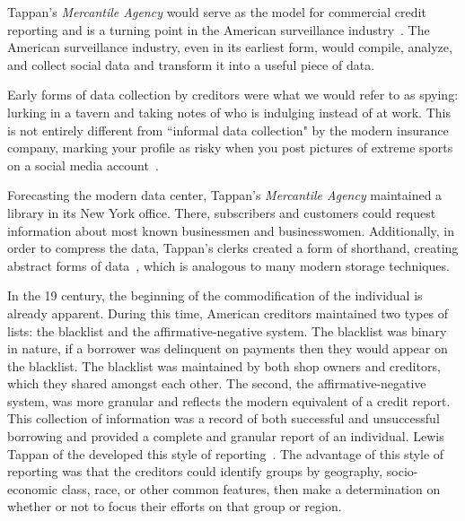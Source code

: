 Tappan's \textit{Mercantile Agency} would serve as the model for commercial
credit reporting and is a turning point in the American surveillance
industry~\cite{lauer2017creditworthy}. The American surveillance industry,
even in its earliest form, would compile, analyze, and collect social data and
transform it into a useful piece of data.

Early forms of data collection by creditors were what we would refer to as
spying: lurking in a tavern and taking notes of who is indulging instead of at
work. This is not entirely different from ``informal data collection" by the
modern insurance company, marking your profile as risky when you post pictures
of extreme sports on a social media account~\cite{naic2012}.

Forecasting the modern data center, Tappan's \textit{Mercantile Agency}
maintained a library in its New York office. There, subscribers and customers
could request information about most known businessmen and businesswomen.
Additionally, in order to compress the data, Tappan's clerks created a form of
shorthand, creating abstract forms of data~\cite{lauer2017creditworthy}, which
is analogous to many modern storage techniques.


In the 19 century, the beginning of the commodification of the
individual is already apparent. During this time, American creditors maintained
two types of lists: the blacklist and the affirmative-negative system. The
blacklist was binary in nature, if a borrower was delinquent on payments then
they would appear on the blacklist. The blacklist was maintained by both shop
owners and creditors, which they shared amongst each other. The second, the
affirmative-negative system, was more granular and reflects the modern
equivalent of a credit report. This collection of information was a record of
both successful and unsuccessful borrowing and provided a complete and granular
report of an individual. Lewis Tappan of the \mca developed this style of
reporting~\cite{lauer2017creditworthy}. The advantage of this style of
reporting was that the creditors could identify groups by geography,
socio-economic class, race, or other common features, then make a determination
on whether or not to focus their efforts on that group or region.

